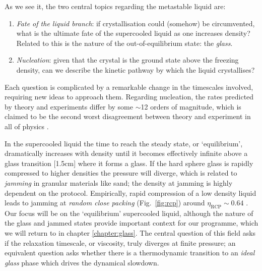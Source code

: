 \documentclass[11pt,twoside]{report}
\begin{document}
As we see it, the two central topics regarding the metastable liquid are:
\begin{enumerate}
\item \emph{Fate of the liquid branch}: if crystallisation could (somehow) be circumvented, what is the ultimate fate of the supercooled liquid as one increases density?
  Related to this is the nature of the out-of-equilibrium state: the \emph{glass}.
\item \emph{Nucleation}: given that the crystal is the ground state above the freezing density, can we describe the kinetic pathway by which the liquid crystallises?
\end{enumerate}
Each question is complicated by a remarkable change in the timescales involved, requiring new ideas to approach them.
Regarding nucleation, the rates predicted by theory and experiments differ by some $\sim$12 orders of magnitude, which is claimed to be the second worst disagreement%
between theory and experiment in all of physics \cite{RussoSM2013}.

In the supercooled liquid the time to reach the steady state, or `equilibrium', dramatically increases with density until it becomes effectively infinite above a glass transition%
[1.5cm]
where it forms a glass.
If the hard sphere glass is rapidly compressed to higher densities the pressure will diverge, which is related to \emph{jamming} in granular materials like sand; the density at jamming is highly dependent on the protocol.
Empirically, rapid compression of a low density liquid leads to jamming at \emph{random close packing} (Fig.\ \ref{fig:rcp}) around $\eta_\mathrm{RCP} \sim 0.64$ \cite{TorquatoRMP2010}.
Our focus will be on the `equilibrium' supercooled liquid, although the nature of the glass and jammed states provide important context for our programme, which we will return to in chapter \ref{chapter:glass}.
The central question of this field asks if the relaxation timescale, or viscosity, truly diverges at finite pressure; an equivalent question asks whether there is a thermodynamic transition to an \emph{ideal glass} phase which drives the dynamical slowdown.
\end{document}
